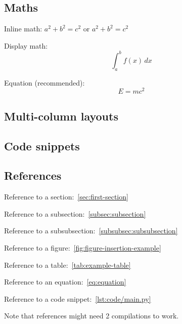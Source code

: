 \subsection{Maths}\label{subsec:maths}
Inline math: \( a^2 + b^2 = c^2 \) or $ a^2 + b^2 = c^2 $

Display math:
\[
    \int_{a}^{b} f(x) \, dx
\]

Equation (recommended):
\begin{equation}
    E = mc^2\label{eq:equation}
\end{equation}

\subsection{Multi-column layouts}\label{subsec:multi-column-layouts}
\begin{multicols}{2}
    \lipsum[1]
\end{multicols}

\subsection{Code snippets}\label{subsec:code-snippets}


\subsection{References}\label{subsec:references}
Reference to a section:~\ref{sec:first-section}

Reference to a subsection:~\ref{subsec:subsection}

Reference to a subsubsection:~\ref{subsubsec:subsubsection}

Reference to a figure:~\ref{fig:figure-insertion-example}

Reference to a table:~\ref{tab:example-table}

Reference to an equation:~\eqref{eq:equation}

Reference to a code snippet:~\ref{lst:code/main.py}

Note that references might need 2 compilations to work.